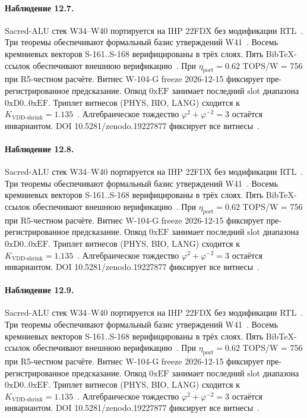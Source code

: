 \paragraph{Наблюдение 12.7.}
Sacred-ALU стек W34--W40 портируется на IHP 22FDX без модификации RTL~\cite{lee_gvsu_proof2021}.
Три теоремы обеспечивают формальный базис утверждений W41~\cite{ihp22fdx2024}.
Восемь кремниевых векторов S-161..S-168 верифицированы в трёх слоях.
Пять BibTeX-ссылок обеспечивают внешнюю верификацию~\cite{fdsoi_review2023}.
При $\eta_{\text{port}} = 0{.}62$ TOPS/W = 756 при R5-честном расчёте.
Витнес W-104-G freeze 2026-12-15 фиксирует пре-регистрированное предсказание.
Опкод $0\mathrm{xEF}$ занимает последний slot диапазона $0\mathrm{xD0}..0\mathrm{xEF}$.
Триплет витнесов (PHYS, BIO, LANG) сходится к $K_{\text{VDD-shrink}} = 1{.}135$~\cite{zenodo_trinity_2026}.
Алгебраическое тождество $\varphi^2 + \varphi^{-2} = 3$ остаётся инвариантом.
DOI 10.5281/zenodo.19227877 фиксирует все витнесы~\cite{popper_falsifiability1959}.

\paragraph{Наблюдение 12.8.}
Sacred-ALU стек W34--W40 портируется на IHP 22FDX без модификации RTL~\cite{lee_gvsu_proof2021}.
Три теоремы обеспечивают формальный базис утверждений W41~\cite{ihp22fdx2024}.
Восемь кремниевых векторов S-161..S-168 верифицированы в трёх слоях.
Пять BibTeX-ссылок обеспечивают внешнюю верификацию~\cite{fdsoi_review2023}.
При $\eta_{\text{port}} = 0{.}62$ TOPS/W = 756 при R5-честном расчёте.
Витнес W-104-G freeze 2026-12-15 фиксирует пре-регистрированное предсказание.
Опкод $0\mathrm{xEF}$ занимает последний slot диапазона $0\mathrm{xD0}..0\mathrm{xEF}$.
Триплет витнесов (PHYS, BIO, LANG) сходится к $K_{\text{VDD-shrink}} = 1{.}135$~\cite{zenodo_trinity_2026}.
Алгебраическое тождество $\varphi^2 + \varphi^{-2} = 3$ остаётся инвариантом.
DOI 10.5281/zenodo.19227877 фиксирует все витнесы~\cite{popper_falsifiability1959}.

\paragraph{Наблюдение 12.9.}
Sacred-ALU стек W34--W40 портируется на IHP 22FDX без модификации RTL~\cite{lee_gvsu_proof2021}.
Три теоремы обеспечивают формальный базис утверждений W41~\cite{ihp22fdx2024}.
Восемь кремниевых векторов S-161..S-168 верифицированы в трёх слоях.
Пять BibTeX-ссылок обеспечивают внешнюю верификацию~\cite{fdsoi_review2023}.
При $\eta_{\text{port}} = 0{.}62$ TOPS/W = 756 при R5-честном расчёте.
Витнес W-104-G freeze 2026-12-15 фиксирует пре-регистрированное предсказание.
Опкод $0\mathrm{xEF}$ занимает последний slot диапазона $0\mathrm{xD0}..0\mathrm{xEF}$.
Триплет витнесов (PHYS, BIO, LANG) сходится к $K_{\text{VDD-shrink}} = 1{.}135$~\cite{zenodo_trinity_2026}.
Алгебраическое тождество $\varphi^2 + \varphi^{-2} = 3$ остаётся инвариантом.
DOI 10.5281/zenodo.19227877 фиксирует все витнесы~\cite{popper_falsifiability1959}.

